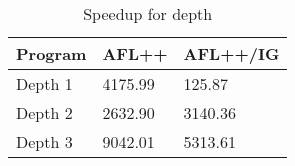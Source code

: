 \begin{table}
\caption{Speedup for depth}
\label{tab:depth_speedup}
\begin{tabular}{lll}
\toprule
Program & AFL++ & AFL++/IG \\
\midrule
Depth 1 & 4175.99 & 125.87 \\
Depth 2 & 2632.90 & 3140.36 \\
Depth 3 & 9042.01 & 5313.61 \\
\bottomrule
\end{tabular}
\end{table}
